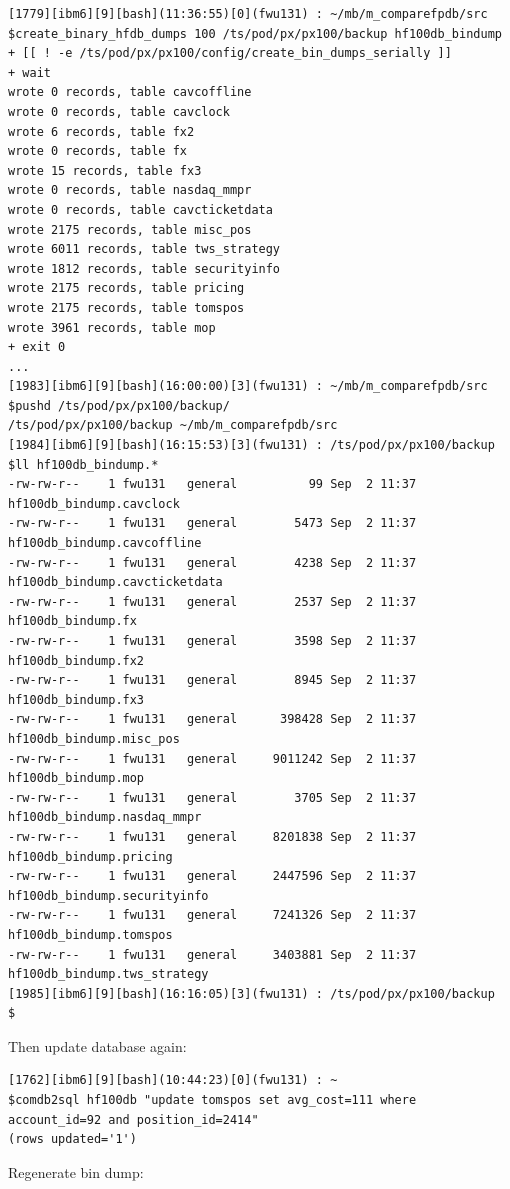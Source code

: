 \documentclass[8pt,]{article}
\begin{document}
\begin{verbatim}
[1779][ibm6][9][bash](11:36:55)[0](fwu131) : ~/mb/m_comparefpdb/src
$create_binary_hfdb_dumps 100 /ts/pod/px/px100/backup hf100db_bindump
+ [[ ! -e /ts/pod/px/px100/config/create_bin_dumps_serially ]]
+ wait
wrote 0 records, table cavcoffline
wrote 0 records, table cavclock
wrote 6 records, table fx2
wrote 0 records, table fx
wrote 15 records, table fx3
wrote 0 records, table nasdaq_mmpr
wrote 0 records, table cavcticketdata
wrote 2175 records, table misc_pos
wrote 6011 records, table tws_strategy
wrote 1812 records, table securityinfo
wrote 2175 records, table pricing
wrote 2175 records, table tomspos
wrote 3961 records, table mop
+ exit 0
...
[1983][ibm6][9][bash](16:00:00)[3](fwu131) : ~/mb/m_comparefpdb/src
$pushd /ts/pod/px/px100/backup/
/ts/pod/px/px100/backup ~/mb/m_comparefpdb/src
[1984][ibm6][9][bash](16:15:53)[3](fwu131) : /ts/pod/px/px100/backup
$ll hf100db_bindump.*
-rw-rw-r--    1 fwu131   general          99 Sep  2 11:37 hf100db_bindump.cavclock
-rw-rw-r--    1 fwu131   general        5473 Sep  2 11:37 hf100db_bindump.cavcoffline
-rw-rw-r--    1 fwu131   general        4238 Sep  2 11:37 hf100db_bindump.cavcticketdata
-rw-rw-r--    1 fwu131   general        2537 Sep  2 11:37 hf100db_bindump.fx
-rw-rw-r--    1 fwu131   general        3598 Sep  2 11:37 hf100db_bindump.fx2
-rw-rw-r--    1 fwu131   general        8945 Sep  2 11:37 hf100db_bindump.fx3
-rw-rw-r--    1 fwu131   general      398428 Sep  2 11:37 hf100db_bindump.misc_pos
-rw-rw-r--    1 fwu131   general     9011242 Sep  2 11:37 hf100db_bindump.mop
-rw-rw-r--    1 fwu131   general        3705 Sep  2 11:37 hf100db_bindump.nasdaq_mmpr
-rw-rw-r--    1 fwu131   general     8201838 Sep  2 11:37 hf100db_bindump.pricing
-rw-rw-r--    1 fwu131   general     2447596 Sep  2 11:37 hf100db_bindump.securityinfo
-rw-rw-r--    1 fwu131   general     7241326 Sep  2 11:37 hf100db_bindump.tomspos
-rw-rw-r--    1 fwu131   general     3403881 Sep  2 11:37 hf100db_bindump.tws_strategy
[1985][ibm6][9][bash](16:16:05)[3](fwu131) : /ts/pod/px/px100/backup
$
\end{verbatim}

Then update database again:

\begin{verbatim}
[1762][ibm6][9][bash](10:44:23)[0](fwu131) : ~
$comdb2sql hf100db "update tomspos set avg_cost=111 where account_id=92 and position_id=2414"
(rows updated='1')
\end{verbatim}

Regenerate bin dump:
\end{document}
